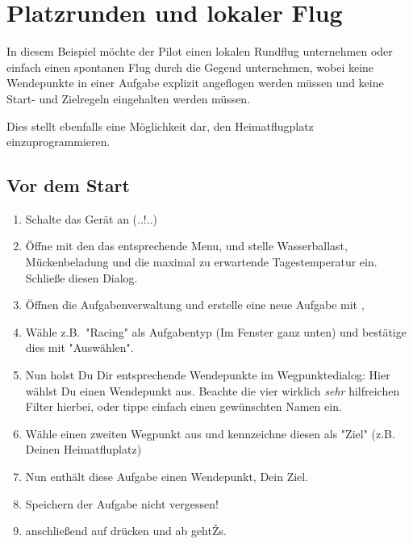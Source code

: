 \section{Platzrunden und lokaler Flug}\label{sec:local-flight}

In diesem Beispiel möchte der Pilot einen lokalen Rundflug unternehmen oder einfach einen spontanen Flug durch die Gegend
unternehmen, wobei keine Wendepunkte in einer Aufgabe explizit angeflogen werden müssen und keine
Start- und Zielregeln eingehalten werden müssen.

Dies stellt ebenfalls eine Möglichkeit dar, den Heimatflugplatz einzuprogrammieren.

\subsection*{Vor dem Start}
\begin{enumerate}
\item  Schalte das Gerät an (..!..)
\item  Öffne mit den  das entsprechende Menu,
und stelle Wasserballast, Mückenbeladung und die maximal zu erwartende  Tagestemperatur ein. Schließe diesen Dialog.
\item  Öffnen die Aufgabenverwaltung   und erstelle eine neue  Aufgabe mit , 
\item  Wähle z.B.\ "Racing" als Aufgabentyp (Im Fenster ganz unten) und bestätige dies mit "Auswählen".
\item  Nun holst Du Dir entsprechende Wendepunkte im Wegpunktedialog: 
Hier wählst Du einen Wendepunkt aus.  Beachte die vier wirklich \textsl{sehr} hilfreichen Filter
hierbei, oder tippe einfach einen gewünschten Namen ein.
\item Wähle einen zweiten Wegpunkt aus und kennzeichne diesen als "Ziel"  (z.B. Deinen Heimatfluplatz)
\item Nun enthält diese Aufgabe einen Wendepunkt, Dein Ziel.
\item Speichern der Aufgabe nicht vergessen!
\item anschließend auf  drücken und ab gehtŽs.
\end{enumerate}

